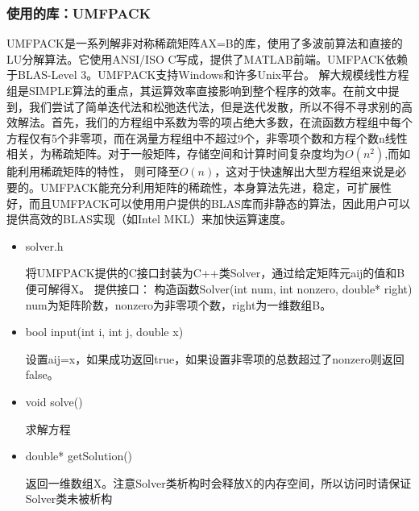 \documentclass[12pt]{article}
\begin{document}
\subsubsection{使用的库：UMFPACK}
UMFPACK是一系列解非对称稀疏矩阵AX=B的库，使用了多波前算法和直接的LU分解算法。它使用ANSI/ISO C写成，提供了MATLAB前端。UMFPACK依赖于BLAS-Level 3。UMFPACK支持Windows和许多Unix平台。
解大规模线性方程组是SIMPLE算法的重点，其运算效率直接影响到整个程序的效率。在前文中提到，我们尝试了简单迭代法和松弛迭代法，但是迭代发散，所以不得不寻求别的高效解法。首先，我们的方程组中系数为零的项占绝大多数，在流函数方程组中每个方程仅有5个非零项，而在涡量方程组中不超过9个，非零项个数和方程个数n线性相关，为稀疏矩阵。对于一般矩阵，存储空间和计算时间复杂度均为$O(n^2)$,而如能利用稀疏矩阵的特性，
则可降至$O(n)$，这对于快速解出大型方程组来说是必要的。UMFPACK能充分利用矩阵的稀疏性，本身算法先进，稳定，可扩展性好，而且UMFPACK可以使用用户提供的BLAS库而非静态的算法，因此用户可以提供高效的BLAS实现（如Intel MKL）来加快运算速度。
\begin{itemize}
\item solver.h

将UMFPACK提供的C接口封装为C++类Solver，通过给定矩阵元aij的值和B便可解得X。
提供接口：
构造函数Solver(int num, int nonzero, double* right)
num为矩阵阶数，nonzero为非零项个数，right为一维数组B。
\item bool input(int i, int j, double x)

设置aij=x，如果成功返回true，如果设置非零项的总数超过了nonzero则返回false。

\item void solve()

求解方程

\item double* getSolution()

返回一维数组X。注意Solver类析构时会释放X的内存空间，所以访问时请保证Solver类未被析构

\end{itemize}
\end{document}
